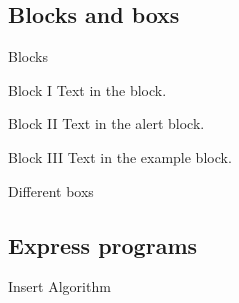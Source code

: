 \documentclass{libs/SUSTech_format}
\begin{document}
\subsection{Blocks and boxs}
\begin{frame}{Blocks}
    \begin{block}{Block I}
        Text in the block.
    \end{block}

    \begin{alertblock}{Block II}
        Text in the alert block.
    \end{alertblock}

    \begin{exampleblock}{Block III}
        Text in the example block.
    \end{exampleblock}   
\end{frame}

\begin{frame}{Different boxs}

    \pause


    \pause

\end{frame}

\subsection{Express programs}
\begin{frame}{Insert Algorithm}
    \begin{algorithm}[H]
        \SetAlgoLined
        \LinesNumbered
         \caption{Algorithm Example}
    \end{algorithm}
\end{frame}


\end{document}
